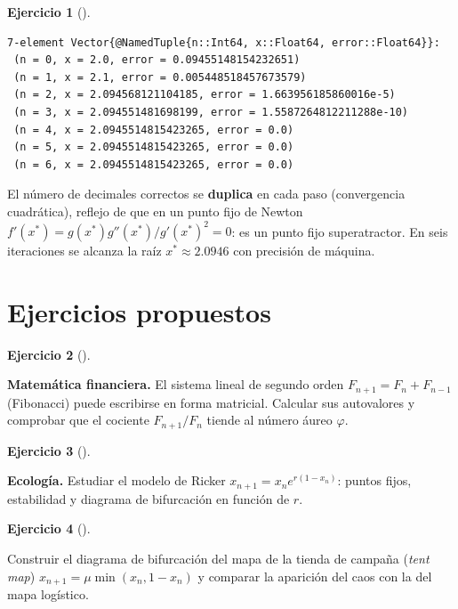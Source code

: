 \documentclass[
  spanish,
  a4paper,
]{scrreport}
\theoremstyle{definition}
\newtheorem{exercise}{Ejercicio}[chapter]
\theoremstyle{remark}
\begin{document}
\begin{exercise}[]
\begin{tcolorbox}
\begin{verbatim}
7-element Vector{@NamedTuple{n::Int64, x::Float64, error::Float64}}:
 (n = 0, x = 2.0, error = 0.09455148154232651)
 (n = 1, x = 2.1, error = 0.005448518457673579)
 (n = 2, x = 2.094568121104185, error = 1.663956185860016e-5)
 (n = 3, x = 2.094551481698199, error = 1.5587264812211288e-10)
 (n = 4, x = 2.0945514815423265, error = 0.0)
 (n = 5, x = 2.0945514815423265, error = 0.0)
 (n = 6, x = 2.0945514815423265, error = 0.0)
\end{verbatim}

El número de decimales correctos se \textbf{duplica} en cada paso
(convergencia cuadrática), reflejo de que en un punto fijo de Newton
\(f'(x^*) = g(x^*)g''(x^*)/g'(x^*)^2 = 0\): es un punto fijo
superatractor. En seis iteraciones se alcanza la raíz
\(x^* \approx 2.0946\) con precisión de máquina.

\end{tcolorbox}

\end{exercise}

\section{Ejercicios propuestos}\label{ejercicios-propuestos-5}

\begin{exercise}[]\protect\hypertarget{exr-propuesto-fibonacci}{}\label{exr-propuesto-fibonacci}

\textbf{Matemática financiera.} El sistema lineal de segundo orden
\(F_{n+1} = F_n + F_{n-1}\) (Fibonacci) puede escribirse en forma
matricial. Calcular sus autovalores y comprobar que el cociente
\(F_{n+1}/F_n\) tiende al número áureo \(\varphi\).

\end{exercise}

\begin{exercise}[]\protect\hypertarget{exr-propuesto-ricker}{}\label{exr-propuesto-ricker}

\textbf{Ecología.} Estudiar el modelo de Ricker
\(x_{n+1} = x_n e^{r(1 - x_n)}\): puntos fijos, estabilidad y diagrama
de bifurcación en función de \(r\).

\end{exercise}

\begin{exercise}[]\protect\hypertarget{exr-propuesto-tienda}{}\label{exr-propuesto-tienda}

Construir el diagrama de bifurcación del mapa de la tienda de campaña
(\emph{tent map}) \(x_{n+1} = \mu\min(x_n, 1-x_n)\) y comparar la
aparición del caos con la del mapa logístico.

\end{exercise}
\end{document}
